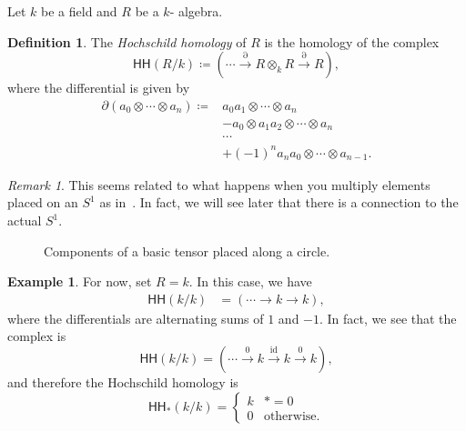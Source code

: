 \documentclass[10pt, oneside]{memoir}
\theoremstyle{definition}
\newtheorem{defn}[thm]{Definition}
\newtheorem{exm}[thm]{Example}
\theoremstyle{remark}
\newtheorem{rmk}[thm]{Remark}
\theoremstyle{plain}
\theoremstyle{definition}
\theoremstyle{remark}
\newcommand{\mr}[1]{\mathrm{#1}}
\newcommand{\ms}[1]{\mathsf{#1}}
\newcommand{\1}{\mathbf{1}}
\newcommand{\2}{\mathbf{2}}
\newcommand{\3}{\mathbf{3}}
\newcommand{\HH}{\ms{HH}}
\begin{document}
Let \(k\) be a field and \(R\) be a \(k\)- algebra.

\begin{defn}
    The \textit{Hochschild homology} of \(R\) is the homology of the complex
    \[
        \HH(R/k) \coloneqq (\cdots \xrightarrow{\partial} R \otimes_k R \xrightarrow{\partial} R),
    \]
    where the differential is given by
    \begin{align*}
        \partial(a_0 \otimes \cdots \otimes a_n) \coloneqq{} & a_0 a_1 \otimes \cdots \otimes a_n \\
        &- a_0 \otimes a_1 a_2 \otimes \cdots \otimes a_n \\
        & \cdots \\
        &+ (-1)^n a_n a_0 \otimes \cdots \otimes a_{n-1}.
    \end{align*}
\end{defn}

\begin{rmk}
    This seems related to what happens when you multiply elements placed on an \(S^1\) as in~. In fact, we will see later that there is a connection to the actual \(S^1\).
    \begin{figure}[htpb]
    \begin{center}
    \end{center}
    \caption{Components of a basic tensor placed along a circle.}%
    \label{fig:hhcircle}
    \end{figure}
\end{rmk}

\begin{exm}
    For now, set \(R=k\). In this case, we have
    \begin{align*}
        \HH(k/k) &= (\cdots \to k \to k),
    \end{align*}
    where the differentials are alternating sums of $1$ and $-1$. In fact, we see that the complex is
    \[ \HH(k/k) = (\cdots \xrightarrow{0} k \xrightarrow{\mr{id}} k \xrightarrow{0}k), \]
    and therefore the Hochschild homology is
    \[ \HH_*(k/k) = \begin{cases}
        k & *=0 \\
        0 & \text{otherwise}.
    \end{cases} \]
\end{exm}
\end{document}
